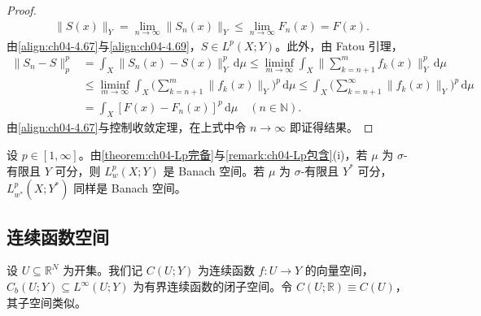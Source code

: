 \documentclass[../../main.tex]{subfiles}%
\begin{document}
\begin{proof}
\begin{align}
\|S(x)\|_Y=\lim_{n\to\infty}\|S_n(x)\|_Y\leqslant\lim_{n\to\infty}F_n(x)=F(x). \label{align:ch04-4.69}
\end{align}
由\eqref{align:ch04-4.67}与\eqref{align:ch04-4.69}，$S\in L^p(X;Y)$。此外，由 Fatou 引理，
\begin{align}
\|S_n-S\|_p^p&=\int_X\|S_n(x)-S(x)\|_Y^p\,\mathrm{d}\mu
\leqslant\liminf_{m\to\infty}\int_X\Big\|\sum_{k=n+1}^m f_k(x)\Big\|_Y^p\,\mathrm{d}\mu\nonumber\\
&\leqslant\liminf_{m\to\infty}\int_X\Big(\sum_{k=n+1}^m\|f_k(x)\|_Y\Big)^p\,\mathrm{d}\mu
\leqslant\int_X\Big(\sum_{k=n+1}^\infty\|f_k(x)\|_Y\Big)^p\,\mathrm{d}\mu\nonumber\\
&=\int_X[F(x)-F_n(x)]^p\,\mathrm{d}\mu\quad(n\in\mathbb{N}). \label{align:ch04-4.70}
\end{align}
由\eqref{align:ch04-4.67}与控制收敛定理，在上式中令 $n\to\infty$ 即证得结果。
\end{proof}

\begin{remark}\label{remark:ch04-弱Lp完备}
设 $p\in[1,\infty]$。由\cref{theorem:ch04-Lp完备}与\cref{remark:ch04-Lp包含}(i)，若 $\mu$ 为 $\sigma$-有限且 $Y$ 可分，则 $L^p_w(X;Y)$ 是 Banach 空间。若 $\mu$ 为 $\sigma$-有限且 $Y^*$ 可分，$L^p_{w^*}(X;Y^*)$ 同样是 Banach 空间。
\end{remark}

\subsection{连续函数空间}\label{subsection:ch04-连续函数空间}

设 $U\subseteq\mathbb{R}^N$ 为开集。我们记 $C(U;Y)$ 为连续函数 $f:U\to Y$ 的向量空间，$C_b(U;Y)\subseteq L^\infty(U;Y)$ 为有界连续函数的闭子空间。令 $C(U;\mathbb{R})\equiv C(U)$，其子空间类似。
\end{document}
